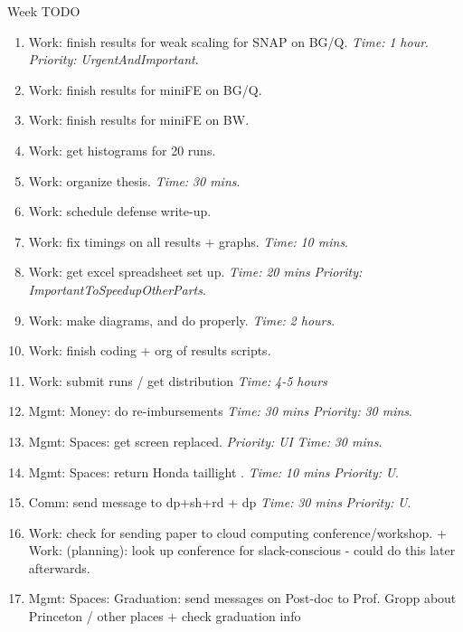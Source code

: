 \documentclass[serif, mathserif, final]{beamer}
\newcommand{\timeEst}[1]{\textit{Time:} \textit{#1}}
\newcommand{\priority}[1]{\textit{Priority:} \textit{#1}}
\begin{document}
\begin{frame}{}
\begin{columns}
\begin{column}{0.50\linewidth}
\begin{block}{Week TODO}
\begin{enumerate}
    \item \tiny Work: finish results for weak scaling for SNAP on
      BG/Q. \timeEst{1 hour}. \priority{UrgentAndImportant}. 

    \item \tiny Work: finish results for miniFE on BG/Q. 
    \item \tiny Work: finish results for miniFE on BW.         
    \item \tiny Work: get histograms for 20 runs. 

    \item \tiny Work: organize thesis. \timeEst{30 mins}.   
    \item \tiny Work: schedule defense write-up. 

    \item \tiny Work: fix timings on all results + graphs. \timeEst{10 mins}. 
    \item \tiny Work: get excel spreadsheet set up. \timeEst{20 mins} \priority{ImportantToSpeedupOtherParts}. 

    \item \tiny Work: make diagrams, and do properly. \timeEst{2 hours}.  
    \item \tiny Work: finish coding + org of results scripts.
      \tiny \item \tiny Work: submit runs / get distribution \timeEst{4-5 hours}
    \item \tiny Mgmt: Money: do re-imbursements \timeEst{30 mins} \priority{30 mins}. 
    \item \tiny Mgmt: Spaces: get screen replaced. \priority{UI} \timeEst{30 mins}. 
    \item \tiny Mgmt: Spaces: return Honda taillight . \timeEst{10 mins} \priority{U}. 
    \item \tiny Comm: send message to dp+sh+rd   + dp \timeEst{30 mins} \priority{U}. 
    \item \tiny Work: check for sending paper to cloud computing
      conference/workshop. +  Work: (planning): look up conference for
      slack-conscious  - could do this later afterwards. 
    \item \tiny Mgmt: Spaces: Graduation: send messages on Post-doc to
      Prof. Gropp about Princeton / other places + check graduation info 
\end{enumerate}
\end{block} 



\end{column}
\end{columns}
\end{frame}
\end{document}
